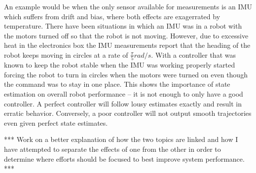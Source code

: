 An example would be when the only sensor available for measurements is an IMU which suffers from drift and bias, where both effects are exagerrated by temperature. There have been situations in which an IMU was in a robot with the motors turned off so that the robot is not moving. However, due to excessive heat in the electronics box the IMU measurements report that the heading of the robot keeps moving in circles at a rate of $\frac{\pi}{5} rad/s$. With a controller that was known to keep the robot stable when the IMU was working properly started forcing the robot to turn in circles when the motors were turned on even though the command was to stay in one place. This shows the importance of state estimation on overall robot performance -- it is not enough to only have a good controller. A perfect controller will follow lousy estimates exactly and result in erratic behavior. Conversely, a poor controller will not output smooth trajectories even given perfect state estimates.

*** Work on a better explanation of how the two topics are linked and how I have attempted to separate the effects of one from the other in order to determine where efforts should be focused to best improve system performance. ***